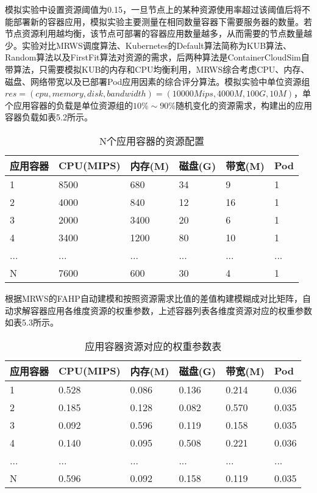 模拟实验中设置资源阈值为0.15，一旦节点上的某种资源使用率超过该阈值后将不能部署新的容器应用，模拟实验主要测量在相同数量容器下需要服务器的数量。若节点资源利用越均衡，该节点可部署的容器应用数量越多，从而需要的节点数量越少。实验对比MRWS调度算法、Kubernetes的Default算法简称为KUB算法、Random算法以及FirstFit算法对资源的需求，后两种算法是ContainerCloudSim自带算法，只需要模拟KUB的内存和CPU均衡利用，MRWS综合考虑CPU、内存、磁盘、网络带宽以及已部署Pod应用因素的综合评分算法。模拟实验中单位资源组$res=(cpu,memory,disk,bandwidth)=(10000Mips,4000M,100G,10M)$，单个应用容器的负载是单位资源组的$10\%\sim 90\%$随机变化的资源需求，构建出的应用容器负载如表5.2所示。
\begin{table}[H]
	\centering\dawu[1.3]
	\caption{N个应用容器的资源配置}
	\begin{tabular}{|p{1.8cm}<{\centering}|p{1.8cm}<{\centering}|p{1.8cm}<{\centering}|p{1.8cm}<{\centering}|p{1.8cm}<{\centering}|p{1.8cm}<{\centering}|} \hline
		应用容器 & CPU(MIPS) & 内存(M) & 磁盘(G) & 带宽(M) & Pod \\ \hline
		 1 & 8500 & 680 & 34 & 9 &1 \\ \hline
		 2 & 4000 & 840 & 12 & 16 & 1 \\ \hline
		 3 & 2000 & 3400 & 20 & 6 & 1 \\ \hline
		 4 & 3400 & 1200 & 80 & 10 & 1 \\ \hline
		 ... & ... & ... & ... & ... & ... \\ \hline
		 N & 7600 & 600 & 30 & 4 & 1 \\ \hline
	\end{tabular}
\end{table}
根据MRWS的FAHP自动建模和按照资源需求比值的差值构建模糊成对比矩阵，自动求解容器应用各维度资源的权重参数，上述容器列表各维度资源对应的权重参数如表5.3所示。
\begin{table}[H]
	\centering\dawu[1.3]
	\caption{应用容器资源对应的权重参数表}
	\begin{tabular}{|p{1.8cm}<{\centering}|p{1.8cm}<{\centering}|p{1.8cm}<{\centering}|p{1.8cm}<{\centering}|p{1.8cm}<{\centering}|p{1.8cm}<{\centering}|} \hline
		应用容器 & CPU(MIPS) & 内存(M) & 磁盘(G) & 带宽(M) & Pod \\ \hline
		 1 & 0.528 & 0.086 & 0.136 & 0.214 & 0.036 \\ \hline
		 2 & 0.185 & 0.128 & 0.082 & 0.570 & 0.035 \\ \hline
		 3 & 0.092 & 0.596 & 0.119 & 0.158 & 0.035 \\ \hline
		 4 & 0.140 & 0.095 & 0.508 & 0.221 & 0.036 \\ \hline
		 ... & ... & ... & ... & ... & ... \\ \hline
		 N & 0.596 & 0.092 & 0.158 & 0.119 & 0.035 \\ \hline
	\end{tabular}
\end{table}
